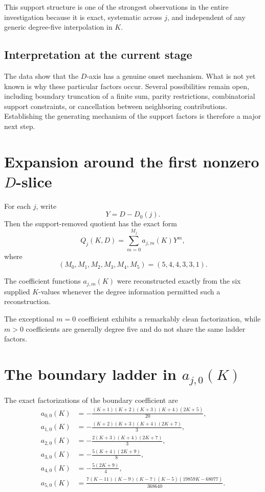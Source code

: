 \documentclass[11pt,a4paper]{article}
\begin{document}
This support structure is one of the strongest observations in the entire investigation because it is exact, systematic across $j$, and independent of any generic degree-five interpolation in $K$.

\subsection{Interpretation at the current stage}

The data show that the $D$-axis has a genuine onset mechanism. What is not yet known is why these particular factors occur. Several possibilities remain open, including boundary truncation of a finite sum, parity restrictions, combinatorial support constraints, or cancellation between neighboring contributions. Establishing the generating mechanism of the support factors is therefore a major next step.

\section{Expansion around the first nonzero $D$-slice}

For each $j$, write
\[
Y=D-D_0(j).
\]
Then the support-removed quotient has the exact form
\begin{equation}
Q_j(K,D)=\sum_{m=0}^{M_j} a_{j,m}(K)Y^m,
\label{eq:Qexp}
\end{equation}
where
\[
(M_0,M_1,M_2,M_3,M_4,M_5)=(5,4,4,3,3,1).
\]

The coefficient functions $a_{j,m}(K)$ were reconstructed exactly from the six supplied $K$-values whenever the degree information permitted such a reconstruction.

The exceptional $m=0$ coefficient exhibits a remarkably clean factorization, while $m>0$ coefficients are generally degree five and do not share the same ladder factors.

\section{The boundary ladder in $a_{j,0}(K)$}

The exact factorizations of the boundary coefficient are
\begin{align}
a_{0,0}(K)
&=-\frac{(K+1)(K+2)(K+3)(K+4)(2K+5)}{20},\\[4pt]
a_{1,0}(K)
&=-\frac{(K+2)(K+3)(K+4)(2K+7)}{3},\\[4pt]
a_{2,0}(K)
&=-\frac{2(K+3)(K+4)(2K+7)}{3},\\[4pt]
a_{3,0}(K)
&=-\frac{5(K+4)(2K+9)}{8},\\[4pt]
a_{4,0}(K)
&=-\frac{5(2K+9)}{4},\\[4pt]
a_{5,0}(K)
&=\frac{7(K-11)(K-9)(K-7)(K-5)(19859K-68077)}{368640}.
\end{align}
\end{document}

